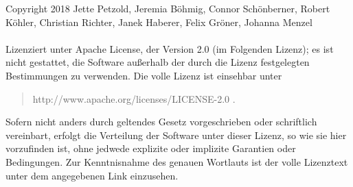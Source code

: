 Copyright 2018 Jette Petzold, Jeremia B\"{o}hmig, Connor Sch\"{o}nberner, Robert K\"{o}hler, Christian Richter, Janek Haberer, Felix Gr\"{o}ner, Johanna Menzel\\
\\Lizenziert unter Apache License, der Version 2.0 (im Folgenden Lizenz); es ist nicht gestattet, die Software au\ss{}erhalb der durch die Lizenz festgelegten Bestimmungen zu verwenden.
Die volle Lizenz ist einsehbar unter
\begin{quote}
	http://www.apache.org/licenses/LICENSE-2.0 .
\end{quote}
Sofern nicht anders durch geltendes Gesetz vorgeschrieben oder schriftlich vereinbart, erfolgt die Verteilung der Software unter dieser Lizenz, so wie sie hier vorzufinden ist, ohne jedwede explizite oder implizite Garantien oder Bedingungen.
Zur Kenntnisnahme des genauen Wortlauts ist der volle Lizenztext unter dem angegebenen Link einzusehen.

